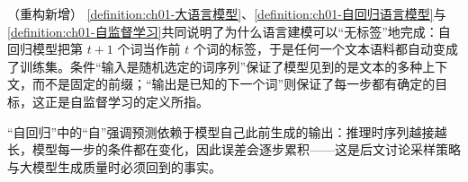 \documentclass[../../main.tex]{subfiles}
\begin{document}
\begin{remark}（重构新增）
\cref{definition:ch01-大语言模型}、\cref{definition:ch01-自回归语言模型}与\cref{definition:ch01-自监督学习}共同说明了为什么语言建模可以“无标签”地完成：自回归模型把第 $t+1$ 个词当作前 $t$ 个词的标签，于是任何一个文本语料都自动变成了训练集。条件“输入是随机选定的词序列”保证了模型见到的是文本的多种上下文，而不是固定的前缀；“输出是已知的下一个词”则保证了每一步都有确定的目标，这正是自监督学习的定义所指。

“自回归”中的“自”强调预测依赖于模型自己此前生成的输出：推理时序列越接越长，模型每一步的条件都在变化，因此误差会逐步累积——这是后文讨论采样策略与大模型生成质量时必须回到的事实。
\end{remark}
\end{document}
